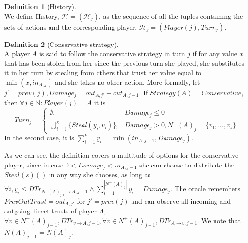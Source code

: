 \documentclass[11pt]{article}
\theoremstyle{definition}
\newtheorem{definition}{Definition}[section]
\theoremstyle{corollary}
\theoremstyle{lemma}
\begin{document}
      \begin{definition}[History] \ \\
         We define History, $\mathcal{H} = (\mathcal{H}_j)$, as the sequence of all the tuples containing the sets of actions
         and the corresponding player. $\mathcal{H}_j = (Player(j), Turn_j)$.
      \end{definition}
      \begin{definition}[Conservative strategy] \ \\
         A player $A$ is said to follow the conservative strategy in turn $j$ if for any value $x$ that has been stolen from
         her since the previous turn she played, she substitutes it in her turn by stealing from others that trust her value
         equal to $\min{(x,in_{A,j})}$ and she takes no other action.
         More formally, let $j' = prev(j), Damage_j = out_{A,j'} - out_{A,j-1}$. If $Strategy(A) = Conservative$, then
         $\forall j \in \mathbb{N}: Player(j) = A$ it is $$Turn_j =
         \begin{cases}
            \emptyset, & Damage_j \leq 0 \\
            \bigcup\limits_{i=1}^{k}\{Steal(y_i,v_i)\}, & Damage_j > 0, N^{-}(A)_j = \{v_1,...,v_k\}
         \end{cases}$$
         In the second case, it is $\sum\limits_{i=1}^{k}y_i = \min(in_{A,j-1}, Damage_j)$. \\
      \end{definition}
      As we can see, the definition covers a multitude of options for the conservative player, since in case $0 < Damage_j <
      in_{A,j-1}$ she can choose to distribute the $Steal(s)()$ in any way she chooses, as long as $\forall i, y_i \leq
      DTr_{N^{-}(A)_{j,i} \rightarrow A, j-1} \wedge \sum\limits_{i=1}^{|N^{-}(A)_j|}y_i = Damage_j$.
      The oracle remembers $PrevOutTrust = out_{A, j'}$ for  $j' = prev(j)$ and can observe all incoming and outgoing direct
      trusts of player $A$, $\forall v \in N^{-}(A)_{j-1}, DTr_{v \rightarrow A, j-1}, \forall v \in N^{+}(A)_{j-1},
      DTr_{A \rightarrow v, j-1}$. We note that $N(A)_{j-1} = N(A)_j$. \\
\end{document}
